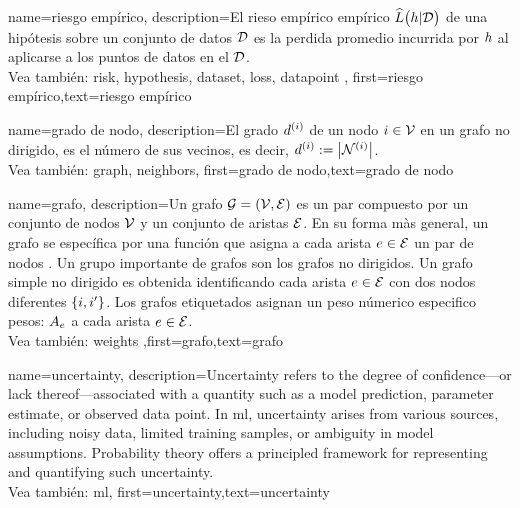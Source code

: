 {name={riesgo empírico},
 description={El rieso empírico empírico $\widehat{L}\big(h|\mathcal{D}\big)$ 
 	de una hipótesis sobre un conjunto de datos $\mathcal{D}$ es la perdida promedio incurrida 
 	por $h$ al aplicarse a los puntos de datos en el $\mathcal{D}$.
	 \\
	 Vea también: \gls{risk}, \gls{hypothesis}, \gls{dataset}, \gls{loss}, \gls{datapoint} },
 first={riesgo empírico},text={riesgo empírico} 
}

{name={grado de nodo},
	description={El grado $d^{(i)}$ de un nodo $i \in \mathcal{V}$ 
		en un grafo no dirigido, es el número de sus vecinos, es decir, $d^{(i)} := \big|\mathcal{N}^{(i)}\big|$.
		\\
	 Vea también: \gls{graph}, \gls{neighbors}},
		first={grado de nodo},text={grado de nodo} 
}


{name={grafo},
	description={Un grafo $\mathcal{G} = \left( \mathcal{V},\mathcal{E} \right)$ es un par compuesto por un  
		conjunto de nodos $\mathcal{V}$ y un conjunto de aristas $\mathcal{E}$. En su forma màs general, un grafo se 
		específica por una función que asigna a cada arista $e \in \mathcal{E}$ un par de nodos \cite{RockNetworks}. 
		Un grupo importante de grafos son los grafos no dirigidos. Un grafo simple no dirigido  
		es obtenida identificando cada arista $e \in \mathcal{E}$ con dos nodos diferentes $\{i,i'\}$. 
		Los grafos etiquetados asignan un peso númerico especifico pesos: $A_{e}$ a cada 
		arista $e \in \mathcal{E}$.
		\\
	 Vea también: \gls{weights} },first={grafo},text={grafo} 
}

{name={uncertainty},
	description={Uncertainty refers to the degree of confidence—or 
		lack thereof—associated with a quantity such as a model prediction, parameter estimate, or 
		observed data point. In \gls{ml}, uncertainty arises from various sources, including 
		noisy data, limited training samples, or ambiguity in model assumptions. Probability theory 
		offers a principled framework for representing and quantifying such uncertainty.
		\\
	 Vea también: \gls{ml}},
	first={uncertainty},text={uncertainty}
}

